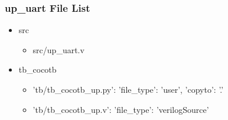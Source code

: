 \subsubsection{up\_uart File List}
\begin{itemize}
\item src
	\begin{itemize}
	\item src/up\_uart.v
	\end{itemize}
\item tb\_cocotb
	\begin{itemize}
	\item {'tb/tb\_cocotb\_up.py': {'file\_type': 'user', 'copyto': '.'}}
	\item {'tb/tb\_cocotb\_up.v': {'file\_type': 'verilogSource'}}
	\end{itemize}
\end{itemize}
